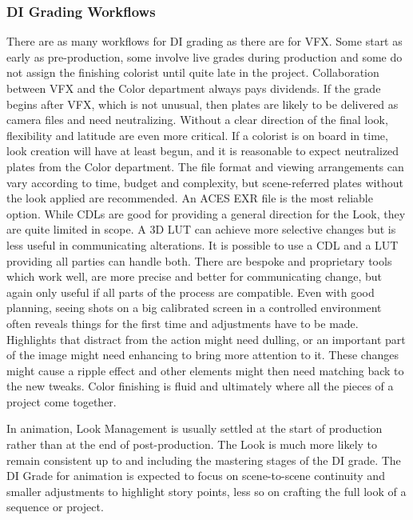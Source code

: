 \subsubsection{DI Grading Workflows}%
\label{subsubsec:di-grading-workflows}

There are as many workflows for DI grading as there are for VFX. Some start as early as pre-production, some involve live grades during production and some do not assign the finishing colorist until quite late in the project. Collaboration between VFX and the Color department always pays dividends. If the grade begins after VFX, which is not unusual, then plates are likely to be delivered as camera files and need neutralizing. Without a clear direction of the final look, flexibility and latitude are even more critical. If a colorist is on board in time, look creation will have at least begun, and it is reasonable to expect neutralized plates from the Color department. The file format and viewing arrangements can vary according to time, budget and complexity, but scene-referred plates without the look applied are recommended. An ACES EXR file is the most reliable option.  While CDLs are good for providing a general direction for the Look, they are quite limited in scope. A 3D LUT can achieve more selective changes but is less useful in communicating alterations. It is possible to use a CDL and a LUT providing all parties can handle both. There are bespoke and proprietary tools which work well, are more precise and better for communicating change, but again only useful if all parts of the process are compatible. Even with good planning, seeing shots on a big calibrated screen in a controlled environment often reveals things for the first time and adjustments have to be made.  Highlights that distract from the action might need dulling, or an important part of the image might need enhancing to bring more attention to it. These changes might cause a ripple effect and other elements might then need matching back to the new tweaks. Color finishing is fluid and ultimately where all the pieces of a project come together.

In animation, Look Management is usually settled at the start of production rather than at the end of post-production. The Look is much more likely to remain consistent up to and including the mastering stages of the DI grade. The DI Grade for animation is expected to focus on scene-to-scene continuity and smaller adjustments to highlight story points, less so on crafting the full look of a sequence or project.

